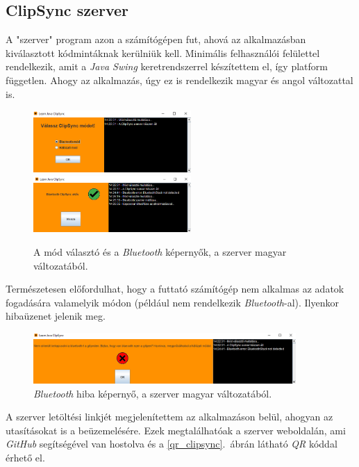 \documentclass[12pt,a4paper]{article}
\begin{document}
	\subsection{ClipSync szerver}
	
	A "szerver" program azon a számítógépen fut, ahová az alkalmazásban kiválasztott kódmintáknak kerülniük kell. Minimális felhasználói felülettel rendelkezik, amit a \textit{Java Swing} keretrendszerrel készítettem el, így platform független. Ahogy az alkalmazás, úgy ez is rendelkezik magyar és angol változattal is.
	
	\begin{figure}[h!]
		\includegraphics[width=6cm]{clipsync_server_select}\hfill
		\includegraphics[width=6cm]{clipsync_server_bluetooth}
		\caption{A mód választó és a \textit{Bluetooth} képernyők, a szerver magyar változatából.}
	\end{figure}

	Természetesen előfordulhat, hogy a futtató számítógép nem alkalmas az adatok fogadására valamelyik módon (például nem rendelkezik \textit{Bluetooth}-al). Ilyenkor hibaüzenet jelenik meg.
	
	\begin{figure}[h!]
		\centering
		\includegraphics[width=10cm]{clipsync_server_error}
		\caption{\textit{Bluetooth} hiba képernyő, a szerver magyar változatából.}
	\end{figure}
	
	A szerver letöltési linkjét megjelenítettem az alkalmazáson belül, ahogyan az utasításokat is a beüzemelésére. Ezek megtalálhatóak a szerver weboldalán, ami \textit{GitHub} segítségével van hostolva és a \ref{qr_clipsync}.\ ábrán látható \textit{QR} kóddal érhető el.
\end{document}
